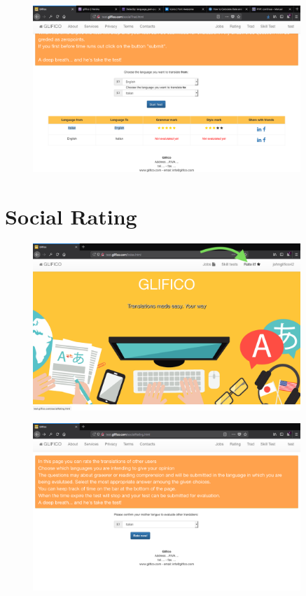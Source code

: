 \documentclass[11 pt, a4paper]{article}
\begin{document}
\begin{figure}[H]
\centering
\includegraphics[width=0.9\textwidth]{translator_socialtrad9.png}
\end{figure}

\clearpage
\section{Social Rating}
\begin{figure}[H]
\centering
\includegraphics[width=0.9\textwidth]{translator_socialrating0.png}
\end{figure}


\begin{figure}[H]
\centering
\includegraphics[width=0.9\textwidth]{translator_socialrating1.png}
\end{figure}
\end{document}
